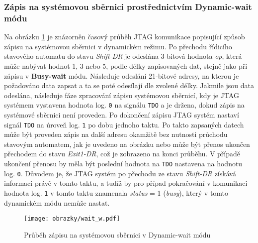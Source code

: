 \subsubsection{Zápis na systémovou sběrnici prostřednictvím Dynamic-wait módu} 
Na obrázku \ref{fig:wait_w} je znázorněn časový průběh \acs{JTAG} komunikace popisující způsob zápisu na systémovou sběrnici v dynamickém  režimu. Po přechodu řídicího stavového automatu do stavu \textit{Shift-DR} je odeslána 3-bitová hodnota \textit{op}, která může nabývat hodnot 1, 3 nebo 5, podle délky zapisovaných dat, stejně jako při zápisu v \textbf{Busy-wait} módu. Následuje odeslání 21-bitové adresy, na kterou je požadováno data zapsat a ta se poté odesílají dle zvolené délky. Jakmile jsou data odeslána, následuje fáze zpracování zápisu systémovou sběrnicí, kdy je \acs{JTAG} systémem vystavena hodnota log. \texttt{0} na signálu \texttt{\acs{TDO}} a je držena, dokud zápis na systémové sběrnici není proveden. Po dokončení zápisu \acs{JTAG} systém nastaví signál \texttt{\acs{TDO}} na úroveň log. \texttt{1} po dobu jednoho taktu. Po takto zapsaných datech může být proveden zápis na další adresu okamžitě bez nutnosti průchodu stavovým automatem, jak je uvedeno na obrázku nebo může být přenos ukončen přechodem do stavu \textit{Exit1-DR}, což je zobrazeno na konci průběhu. V případě ukončení přenosu by měla být poslední hodnota na \texttt{\acs{TDO}} nastavena na hodnotu log. \texttt{0}. Důvodem je, že \acs{JTAG} systém po přechodu ze stavu \textit{Shift-DR} získává informaci právě v tomto taktu, a tudíž by pro případ pokračování v komunikaci hodnota log. \texttt{1} v tomto taktu znamenala \textit{status} = 1 (\textit{busy}), který v tomto dynamickém módu nemůže nastat.

\begin{figure}[!h]
  \begin{center}
    \texttt{[image: obrazky/wait\_w.pdf]}
  \end{center}
  \caption{Průběh zápisu na systémovou sběrnici v Dynamic-wait módu}
	\label{fig:wait_w}
\end{figure}

